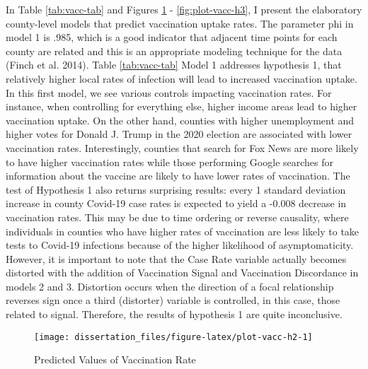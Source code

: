 In Table \ref{tab:vacc-tab} and Figures \ref{fig:plot-vacc-h2} -
\ref{fig:plot-vacc-h3}, I present the elaboratory county-level models that
predict vaccination uptake rates. The parameter phi in model 1 is .985, which is
a good indicator that adjacent time points for each county are related and this
is an appropriate modeling technique for the data (Finch et al. 2014). Table
\ref{tab:vacc-tab} Model 1 addresses hypothesis 1, that relatively higher local
rates of infection will lead to increased vaccination uptake. In this first
model, we see various controls impacting vaccination rates. For instance, when
controlling for everything else, higher income areas lead to higher vaccination
uptake. On the other hand, counties with higher unemployment and higher votes
for Donald J. Trump in the 2020 election are associated with lower vaccination
rates. Interestingly, counties that search for Fox News are more likely to have
higher vaccination rates while those performing Google searches for information
about the vaccine are likely to have lower rates of vaccination. The test of
Hypothesis 1 also returns surprising results: every 1 standard deviation
increase in county Covid-19 case rates is expected to yield a
-0.008
decrease in vaccination rates. This may be due to time ordering or reverse
causality, where individuals in counties who have higher rates of vaccination
are less likely to take tests to Covid-19 infections because of the higher
likelihood of asymptomaticity. However, it is important to note that the Case
Rate variable actually becomes distorted with the addition of Vaccination Signal
and Vaccination Discordance in models 2 and 3. Distortion occurs when the
direction of a focal relationship reverses sign once a third (distorter)
variable is controlled, in this case, those related to signal. Therefore, the
results of hypothesis 1 are quite inconclusive.

\begin{figure}

{\centering \texttt{[image: dissertation\_files/figure-latex/plot-vacc-h2-1]} 

}

\caption{Predicted Values of Vaccination Rate}\label{fig:plot-vacc-h2}
\end{figure}

